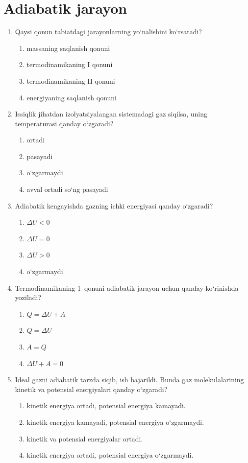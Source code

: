 \section{Adiabatik jarayon}


\begin{enumerate}

\item Qaysi qonun tabiatdagi jarayonlarning yo‘nalishini ko‘rsatadi?
\begin{enumerate}[label=\Alph*)]
\item massaning saqlanish qonuni
\item termodinamikaning I qonuni
\item termodinamikaning II qonuni
\item energiyaning saqlanish qonuni
\end{enumerate}

\item Issiqlik jihatdan izolyatsiyalangan sistemadagi gaz siqilsa, uning temperaturasi qanday o‘zgaradi?
\begin{enumerate}[label=\Alph*)]
\item ortadi
\item pasayadi
\item o‘zgarmaydi
\item avval ortadi so‘ng pasayadi
\end{enumerate}

\item Adiabatik kengayishda gazning ichki energiyasi qanday o‘zgaradi?
\begin{enumerate}[label=\Alph*)]
\item $\Delta U < 0$
\item $\Delta U = 0$
\item $\Delta U > 0$
\item o‘zgarmaydi
\end{enumerate}

\item Termodinamikaning 1–qonuni adiabatik jarayon uchun qanday ko‘rinishda yoziladi?
\begin{enumerate}[label=\Alph*)]
\item $Q = \Delta U + A$
\item $Q = \Delta U$
\item $A = Q$
\item $\Delta U + A = 0$
\end{enumerate}

\item Ideal gazni adiabatik tarzda siqib, ish bajarildi. Bunda gaz molekulalarining kinetik va potensial energiyalari qanday o‘zgaradi?
\begin{enumerate}[label=\Alph*)]
\item kinetik energiya ortadi, potensial energiya kamayadi.
\item kinetik energiya kamayadi, potensial energiya o‘zgarmaydi.
\item kinetik va potensial energiyalar ortadi.
\item kinetik energiya ortadi, potensial energiya o‘zgarmaydi.
\end{enumerate}


\end{enumerate}
